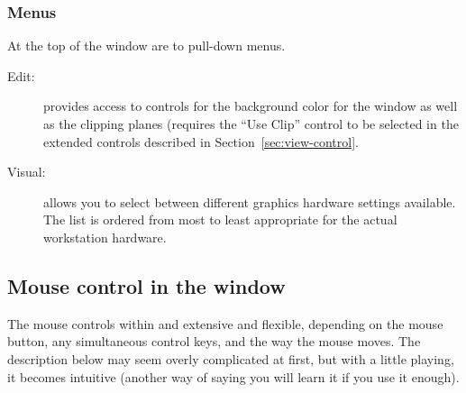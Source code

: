 \subsubsection{Menus}

At the top of the \viewer{} window are to pull-down menus.
\begin{description}
  \item [Edit: ] provides access to controls for the background color for
        the window as well as the clipping planes (requires the ``Use
        Clip'' control to be selected in the extended controls described in
        Section~\ref{sec:view-control}.
  \item [Visual: ] allows you to select between different graphics hardware
        settings available.  The list is ordered from most to least
        appropriate for the actual workstation hardware.
\end{description}

\subsection{Mouse control in the \viewer{} window}
\label{sec:view-mouse} 

The mouse controls within \SR{} and extensive and flexible, depending on
the mouse button, any simultaneous control keys, and the way the mouse
moves.  The description below may seem overly complicated at first, but
with a little playing, it becomes intuitive (another way of saying you will
learn it if you use it enough).

